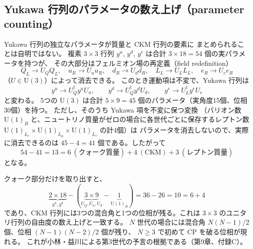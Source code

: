 \documentclass[uplatex,dvipdfmx,a4paper,11pt,openany]{jsbook}
\newcommand{\en}[1]{（#1）}
\numberwithin{equation}{chapter}
\theoremstyle{definition}
\theoremstyle{plain}
\theoremstyle{remark}
\newcommand{\U}{\mathrm{U}}
\begin{document}
\subsection{Yukawa 行列のパラメータの数え上げ（parameter counting）}
Yukawa 行列の独立なパラメータが質量と CKM 行列の要素に
まとめられることは自明ではない。
複素 $3\times3$ 行列 $y^u$, $y^d$, $y^e$ は合計 $3\times18=54$ 個の実パラメータを持つが、
その大部分はフェルミオン場の再定義\en{field redefinition}
\begin{equation}
Q_L\to U_QQ_L,\quad
u_R\to U_uu_R,\quad
d_R\to U_dd_R,\quad
L_L\to U_LL_L,\quad
e_R\to U_ee_R
\end{equation}
（$U\in\U(3)$）によって消去できる。
このとき運動項は不変で、Yukawa 行列は
\begin{equation}
y^u\to U_Q^\dagger y^uU_u,\qquad
y^d\to U_Q^\dagger y^dU_d,\qquad
y^e\to U_L^\dagger y^eU_e
\end{equation}
と変わる。
5つの $\U(3)$ は合計 $5\times9=45$ 個のパラメータ（実角度15個、位相30個）を持つ。
ただし、そのうち Yukawa 項を不変に保つ変換
（バリオン数 $\U(1)_B$ と、ニュートリノ質量がゼロの場合に各世代ごとに保存するレプトン数
$\U(1)_{L_e}\times\U(1)_{L_\mu}\times\U(1)_{L_\tau}$ の計4個）は
パラメータを消去しないので、実際に消去できるのは $45-4=41$ 個である。したがって
\begin{equation}
54-41=13=6\ (\text{クォーク質量})+4\ (\text{CKM})+3\ (\text{レプトン質量})
\end{equation}
となる。

クォーク部分だけを取り出すと、
\begin{equation}
\underbrace{2\times18}_{y^u,y^d}
-\left(\underbrace{3\times9}_{U_Q,U_u,U_d}-\underbrace{1}_{\U(1)_B}\right)
=36-26=10=6+4
\end{equation}
であり、CKM 行列には3つの混合角と1つの位相が残る。これは $3\times3$ のユニタリ行列の自由度の数え上げと一致する。
$N$ 世代の場合には混合角 $N(N-1)/2$ 個、位相 $(N-1)(N-2)/2$ 個が残り、
$N\ge3$ で初めて CP を破る位相が現れる。
これが小林・益川による第3世代の予言の根拠である（第9章、付録C）。
\end{document}
